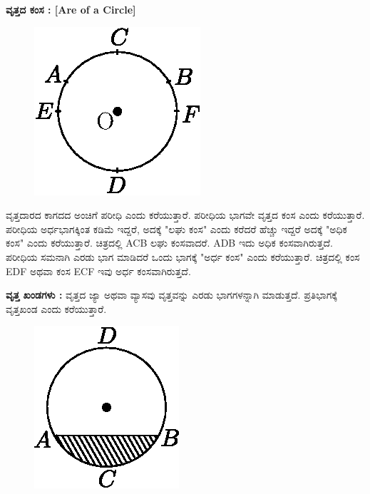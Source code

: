 \noindent
\textbf{ವೃತ್ತದ ಕಂಸ : [Are of a Circle]}
\begin{figure}[H]
\centering
\includegraphics[scale=.98]{src/figure/chap1/fig1-25.eps}
\end{figure}
 
 ವೃತ್ತದಾರದ ಕಾಗದದ ಅಂಚಿಗೆ ಪರೀಧಿ ಎಂದು ಕರೆಯುತ್ತಾರೆ. ಪರೀಧಿಯ ಭಾಗವೇ ವೃತ್ತದ ಕಂಸ ಎಂದು ಕರೆಯುತ್ತಾರೆ. ಪರೀಧಿಯ ಅರ್ಧಭಾಗಕ್ಕಿಂತ ಕಡಿಮೆ ಇದ್ದರೆ, ಅದಕ್ಕೆ "ಲಘು ಕಂಸ" ಎಂದು ಕರೆದರೆ ಹೆಚ್ಚು ಇದ್ದರೆ ಅದಕ್ಕೆ "ಅಧಿಕ ಕಂಸ" ಎಂದು ಕರೆಯುತ್ತಾರೆ. ಚಿತ್ರದಲ್ಲಿ ACB ಲಘು ಕಂಸವಾದರೆ. ADB ಇದು ಅಧಿಕ ಕಂಸವಾಗಿರುತ್ತದೆ. ಪರೀಧಿಯ ಸಮನಾಗಿ ಎರಡು ಭಾಗ ಮಾಡಿದರೆ ಒಂದು ಭಾಗಕ್ಕೆ "ಅರ್ಧ ಕಂಸ" ಎಂದು ಕರೆಯುತ್ತಾರೆ. ಚಿತ್ರದಲ್ಲಿ ಕಂಸ  EDF ಅಥವಾ ಕಂಸ  ECF ಇವು ಅರ್ಧ ಕಂಸವಾಗಿರುತ್ತದೆ. 
 
 
 \noindent
   \textbf{ವೃತ್ತ ಖಂಡಗಳು :} ವೃತ್ತದ ಜ್ಯಾ ಅಥವಾ ವ್ಯಾಸವು ವೃತ್ತವನ್ನು ಎರಡು ಭಾಗಗಳನ್ನಾಗಿ ಮಾಡುತ್ತದೆ. ಪ್ರತಿಭಾಗಕ್ಕೆ ವೃತ್ತಖಂಡ ಎಂದು ಕರೆಯುತ್ತಾರೆ. 
  \begin{figure}[H]
\centering
\includegraphics[scale=.98]{src/figure/chap1/fig1-26.eps}
\end{figure}
 
